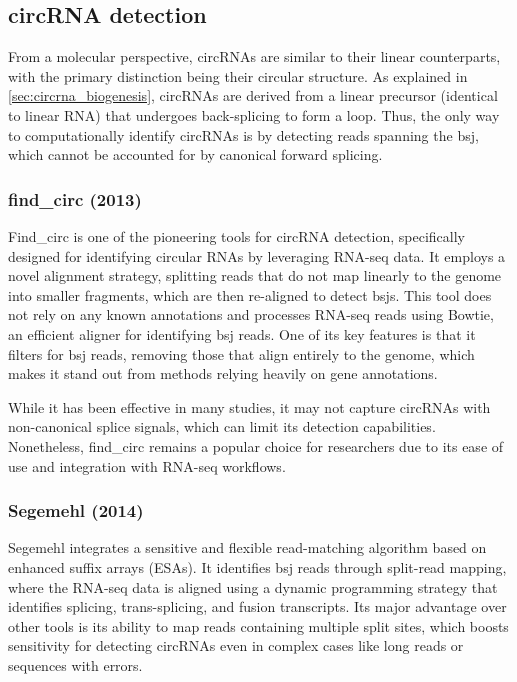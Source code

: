 \subsection{circRNA detection}
\label{subsec:circrna_detection}
From a molecular perspective, circRNAs are similar to their linear
counterparts, with the primary distinction being their circular structure.
As explained in \cref{sec:circrna_biogenesis}, circRNAs are derived from a
linear precursor (identical to linear RNA) that undergoes back-splicing to form
a loop.
Thus, the only way to computationally identify circRNAs is by detecting reads
spanning the \gls{bsj}, which cannot be accounted for by canonical forward
splicing.

\subsubsection{find\_circ (2013)\supercite{memczak_circular_2013}}
Find\_circ is one of the pioneering tools for circRNA detection, specifically
designed for identifying circular RNAs by leveraging RNA-seq data.
It employs a novel alignment strategy, splitting reads that do not map linearly
to the genome into smaller fragments, which are then re-aligned to detect
\gls{bsj}s\supercite{memczak_circular_2013}.
This tool does not rely on any known annotations and processes RNA-seq reads
using Bowtie, an efficient aligner for identifying \gls{bsj} reads.
One of its key features is that it filters for \gls{bsj} reads, removing those
that align entirely to the genome, which makes it stand out from methods
relying heavily on gene annotations\supercite{memczak_circular_2013}.

While it has been effective in many studies, it may not capture circRNAs with
non-canonical splice signals, which can limit its detection
capabilities\supercite{sekar_circular_2018,liu_prkra_2022}.
Nonetheless, find\_circ remains a popular choice for researchers due to its
ease of use and integration with RNA-seq workflows.

\subsubsection{Segemehl (2014)\supercite{hoffmann_multi-split_2014}}
Segemehl integrates a sensitive and flexible read-matching algorithm based on
enhanced suffix arrays (ESAs).
It identifies \gls{bsj} reads through split-read mapping, where the RNA-seq
data is aligned using a dynamic programming strategy that identifies splicing,
trans-splicing, and fusion transcripts.
Its major advantage over other tools is its ability to map reads containing
multiple split sites, which boosts sensitivity for detecting circRNAs even in
complex cases like long reads or sequences with
errors\supercite{hoffmann_multi-split_2014}.


